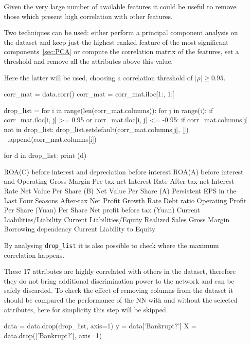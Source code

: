 Given the very large number of available features it could be useful to remove those which present high correlation with other features.

Two techniques can be used: either perform a principal component analysis on the dataset and keep just the highest ranked feature of the most significant components~\ref{sec:PCA} or compute the correlation matrix of the features, set a threshold and remove all the attributes above this value.

Here the latter will be used, choosing a correlation threshold of $|\rho|\geq 0.95$.

\begin{ipython}
corr_mat = data.corr()
corr_mat = corr_mat.iloc[1:, 1:]
	
drop_list = {}
for i in range(len(corr_mat.columns)):
    for j in range(i):
        if corr_mat.iloc[i, j] >= 0.95 or corr_mat.iloc[i, j] <= -0.95:
            if corr_mat.columns[j] not in drop_list:
                drop_list.setdefault(corr_mat.columns[j], []) \
                    .append(corr_mat.columns[i])

for d in drop_list:
    print (d)
\end{ipython}
\begin{ioutput}
ROA(C) before interest and depreciation before interest
ROA(A) before interest and %
Operating Gross Margin
Pre-tax net Interest Rate
After-tax net Interest Rate
Net Value Per Share (B)
Net Value Per Share (A)
Persistent EPS in the Last Four Seasons
After-tax Net Profit Growth Rate
Debt ratio %
Operating Profit Per Share (Yuan)
Per Share Net profit before tax (Yuan)
Current Liabilities/Liability
Current Liabilities/Equity
Realized Sales Gross Margin
Borrowing dependency
Current Liability to Equity
\end{ioutput}
\noindent 
By analysing \texttt{drop\_list} it is also possible to check where the maximum correlation happens.

These 17 attributes are highly correlated with others in the dataset, therefore they do not bring additional discrimination power to the network and can be safely discarded. To check the effect of removing columns from the dataset it should be compared the performance of the NN with and without the selected attributes, here for simplicity this step will be skipped.

\begin{ipython}
data = data.drop(drop_list, axis=1)
y = data['Bankrupt?']
X = data.drop(['Bankrupt?'], axis=1)
\end{ipython}

